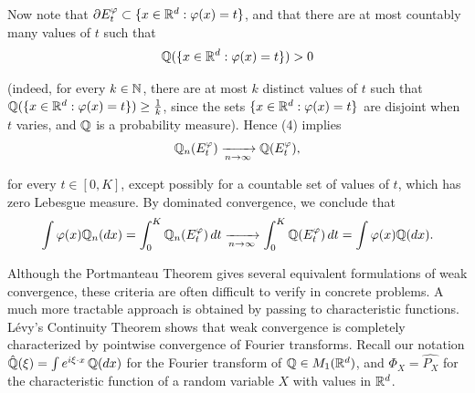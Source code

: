 \documentclass[../Main.tex]{subfiles}
\begin{document}
{Now note that $\partial E_t^\varphi \subset \{x\in\mathbb{R}^d : \varphi(x)=t\}$, and that there are at most countably many values of $t$ such that
\[ \mathbb{Q}(\{x\in\mathbb{R}^d : \varphi(x)=t\}) > 0 \]

(indeed, for every $k\in\mathbb{N}$, there are at most $k$ distinct values of $t$ such that $\mathbb{Q}(\{x\in\mathbb{R}^d : \varphi(x)=t\}) \ge \frac{1}{k}$, since the sets $\{x\in\mathbb{R}^d : \varphi(x)=t\}$ are disjoint when $t$ varies, and $\mathbb{Q}$ is a probability measure). Hence (4) implies
\[ \mathbb{Q}_n(E_t^\varphi) \xrightarrow[n \to \infty]{} \mathbb{Q}(E_t^\varphi), \]

for every $t\in[0,K]$, except possibly for a countable set of values of $t$, which has zero Lebesgue measure. By dominated convergence, we conclude that
\[ \int \varphi(x)\mathbb{Q}_n(dx) = \int_0^K \mathbb{Q}_n(E_t^\varphi)\,dt \xrightarrow[n \to \infty]{} \int_0^K \mathbb{Q}(E_t^\varphi)\,dt = \int \varphi(x)\mathbb{Q}(dx). \]
}



Although the Portmanteau Theorem gives several equivalent formulations of weak convergence, these criteria are often difficult to verify in concrete problems. A much more tractable approach is obtained by passing to characteristic functions. Lévy's Continuity Theorem shows that weak convergence is completely characterized by pointwise convergence of Fourier transforms. Recall our notation $\hat{\mathbb{Q}}(\xi) = \int e^{i\xi\cdot x}\,\mathbb{Q}(dx)$ for the Fourier transform of $\mathbb{Q} \in M_1(\mathbb{R}^d)$, and $\Phi_X=\widehat{P_X}$ for the characteristic function of a random variable $X$
with values in $\mathbb{R}^d$.
\end{document}

